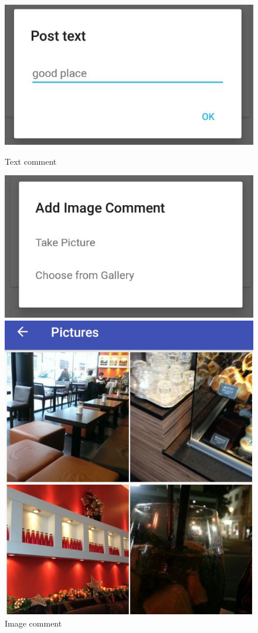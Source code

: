 \begin{figure}[!htb]
	\includegraphics[width=\linewidth]{images/textcomment.jpg}
	\caption{Text comment}\label{fig:textcomment}
	\includegraphics[width=\linewidth]{images/imagecomment.jpg}
	\caption{Image comment}\label{fig:imagecomment}
	\endminipage\hfill
	\includegraphics[width=\linewidth]{images/overview_image.jpg}

\end{figure}
